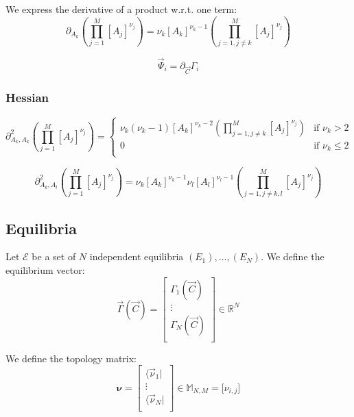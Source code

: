 \documentclass[aps,12pt]{revtex4}
\begin{document}
We express the derivative of a product w.r.t. one term:
\begin{equation}
	\partial_{A_k} \left( \prod_{j=1}^{M} [A_j]^{\nu_{j}} \right)  =
	\nu_k [A_k]^{\nu_k-1} \left( \prod_{j=1,j\not=k}^{M} [A_j]^{\nu_{j}} \right)
\end{equation}
 
 \begin{equation}
	\vec{\Psi}_i = \partial_{\vec{C}} \Gamma_i
\end{equation}

\subsubsection{Hessian}
\begin{equation}
	\partial^2_{A_k,A_k}  \left( \prod_{j=1}^{M} [A_j]^{\nu_{j}} \right) =
	\left\lbrace
	\begin{array}{cl}
	\displaystyle \nu_k(\nu_k-1) [A_k]^{\nu_k-2} \left( \prod_{j=1,j\not=k}^{M} [A_j]^{\nu_{j}} \right) & \text{if $\nu_k>2$}\\
	0 & \text{if $\nu_k\leq2$}\\
	\end{array}
	\right.
\end{equation} 
 
 \begin{equation}
	\partial^2_{A_k,A_l}  \left( \prod_{j=1}^{M} [A_j]^{\nu_{j}} \right) 
 = \nu_k [A_k]^{\nu_k-1} 
   \nu_l [A_l]^{\nu_l-1}
 \left( \prod_{j=1,j\not=k,l}^{M} [A_j]^{\nu_{j}} \right)
\end{equation}
 

\subsection{Equilibria}
Let $\mathcal{E}$ be a set of $N$ independent equilibria $(E_1),\dots,(E_N)$.
We define the equilibrium vector:
\begin{equation}
	\vec{\Gamma}(\vec{C}) =
	\begin{bmatrix}
	\Gamma_1(\vec{C})\\
	\vdots\\
	\Gamma_N(\vec{C})\\
	\end{bmatrix}
	\in \mathbb{R}^N
\end{equation}

We define the topology matrix:
\begin{equation}
	\bm{\nu} = 
	\begin{bmatrix}
	\langle \vec{\nu}_1 \vert\\
	\vdots\\
	\langle\vec{\nu}_N\vert\\
	\end{bmatrix}
	\in \mathbb{M}_{N,M}
	= \lbrack \nu_{i,j} \rbrack
\end{equation}
\end{document}

